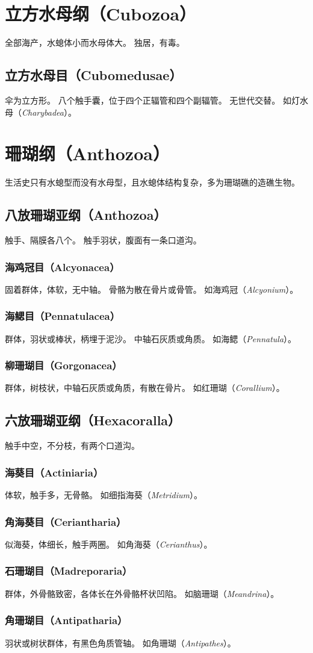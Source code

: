 \documentclass[11pt]{article}
\begin{document}
\section{立方水母纲（Cubozoa）}
全部海产，水螅体小而水母体大。
独居，有毒。

\subsection{立方水母目（Cubomedusae）}
伞为立方形。
八个触手囊，位于四个正辐管和四个副辐管。
无世代交替。
如灯水母（\textit{Charybadea}）。
  
\section{珊瑚纲（Anthozoa）}
生活史只有水螅型而没有水母型，且水螅体结构复杂，多为珊瑚礁的造礁生物。

\subsection{八放珊瑚亚纲（Anthozoa）}
触手、隔膜各八个。
触手羽状，腹面有一条口道沟。

\subsubsection{海鸡冠目（Alcyonacea）}
固着群体，体软，无中轴。
骨骼为散在骨片或骨管。
如海鸡冠（\textit{Alcyonium}）。

\subsubsection{海鳃目（Pennatulacea）}
群体，羽状或棒状，柄埋于泥沙。
中轴石灰质或角质。
如海鳃（\textit{Pennatula}）。

\subsubsection{柳珊瑚目（Gorgonacea）}
群体，树枝状，中轴石灰质或角质，有散在骨片。
如红珊瑚（\textit{Corallium}）。

\subsection{六放珊瑚亚纲（Hexacoralla）}
触手中空，不分枝，有两个口道沟。

\subsubsection{海葵目（Actiniaria）}
体软，触手多，无骨骼。
如细指海葵（\textit{Metridium}）。

\subsubsection{角海葵目（Ceriantharia）}
似海葵，体细长，触手两圈。
如角海葵（\textit{Cerianthus}）。

\subsubsection{石珊瑚目（Madreporaria）}
群体，外骨骼致密，各体长在外骨骼杯状凹陷。
如脑珊瑚（\textit{Meandrina}）。

\subsubsection{角珊瑚目（Antipatharia）}
羽状或树状群体，有黑色角质管轴。
如角珊瑚（\textit{Antipathes}）。
\end{document}
